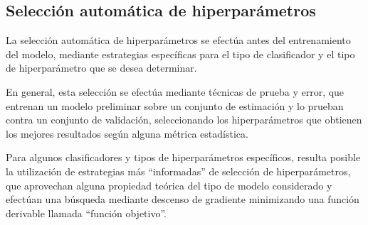 %
%
\subsection{Selección automática de hiperparámetros}
%
La selección automática de hiperparámetros se efectúa antes del
entrenamiento del modelo, mediante estrategias específicas para el
tipo de clasificador y el tipo de hiperparámetro que se desea
determinar.

En general, esta selección se efectúa mediante técnicas de prueba y
error, que entrenan un
modelo preliminar sobre un conjunto de estimación y lo prueban contra
un conjunto de validación, seleccionando los hiperparámetros que
obtienen los mejores resultados según alguna métrica estadística.

Para algunos clasificadores y tipos de hiperparámetros específicos,
resulta posible la utilización de estrategias más ``informadas'' de
selección de hiperparámetros, que aprovechan alguna propiedad teórica
del tipo de modelo considerado y efectúan una búsqueda mediante
descenso de gradiente minimizando una función derivable llamada
``función objetivo''.
